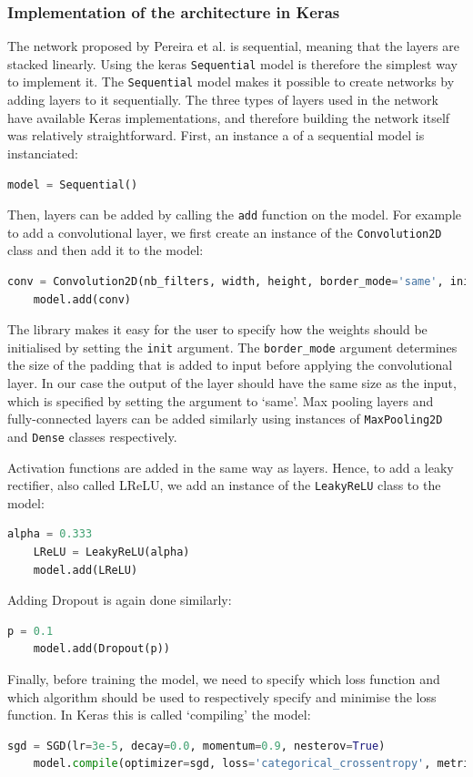 \documentclass[12pt,a4paper,twoside,openright]{report}
\begin{document}
\subsubsection{Implementation of the architecture in Keras}
The network proposed by Pereira et al. is sequential, meaning that the layers are stacked linearly. Using the keras \texttt{Sequential} model is therefore the simplest way to implement it. The \texttt{Sequential} model makes it possible to create networks by adding layers to it sequentially. The three types of layers used in the network have available Keras implementations, and therefore building the network itself was relatively straightforward. First, an instance a of a sequential model is instanciated:
\begin{lstlisting}[language=Python]
	model = Sequential()
\end{lstlisting}
Then, layers can be added by calling the \texttt{add} function on the model. For example to add a convolutional layer, we first create an instance of the \texttt{Convolution2D} class and then add it to the model:
\begin{lstlisting}[language=Python]
	conv = Convolution2D(nb_filters, width, height, border_mode='same', init='glorot_normal')
	model.add(conv)
\end{lstlisting}
The library makes it easy for the user to specify how the weights should be initialised by setting the \texttt{init} argument. The \texttt{border\_mode} argument determines the size of the padding that is added to input before applying the convolutional layer. In our case the output of the layer should have the same size as the input, which is specified by setting the argument to `same'. Max pooling layers and fully-connected layers can be added similarly using instances of \texttt{MaxPooling2D} and \texttt{Dense} classes respectively.

Activation functions are added in the same way as layers. Hence, to add a leaky rectifier, also called LReLU, we add an instance of the \texttt{LeakyReLU} class to the model:
\begin{lstlisting}[language=Python]
	alpha = 0.333
	LReLU = LeakyReLU(alpha)
	model.add(LReLU)
\end{lstlisting}
Adding Dropout is again done similarly:
\begin{lstlisting}[language=Python]
	p = 0.1
	model.add(Dropout(p))
\end{lstlisting}

Finally, before training the model, we need to specify which loss function and which algorithm should be used to respectively specify and minimise the loss function. In Keras this is called `compiling' the model:
\begin{lstlisting}[language=Python]
	sgd = SGD(lr=3e-5, decay=0.0, momentum=0.9, nesterov=True)
	model.compile(optimizer=sgd, loss='categorical_crossentropy', metrics=['accuracy']
\end{lstlisting}
\end{document}
